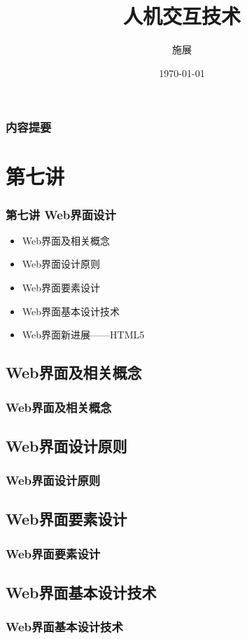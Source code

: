 \documentclass{beamer}
\title{人机交互技术}
\author{施展}
\institute{华中科技大学~武汉光电国家实验室}
\date{\today}
\begin{document}
\begin{frame}
	\titlepage
\end{frame}

\begin{frame}
	\frametitle{内容提要}
	\tableofcontents
\end{frame}

\section{第七讲}
\begin{frame}
	\frametitle{第七讲 Web界面设计}
	\begin{itemize}
		\item Web界面及相关概念
		\item Web界面设计原则
		\item Web界面要素设计
		\item Web界面基本设计技术
		\item Web界面新进展——HTML5
	\end{itemize}
\end{frame}

\subsection{Web界面及相关概念}
\begin{frame}
	\frametitle{Web界面及相关概念}

\end{frame}

\subsection{Web界面设计原则}
\begin{frame}
	\frametitle{Web界面设计原则}

\end{frame}

\subsection{Web界面要素设计}
\begin{frame}
	\frametitle{Web界面要素设计}

\end{frame}

\subsection{Web界面基本设计技术}
\begin{frame}
	\frametitle{Web界面基本设计技术}

\end{frame}
\end{document}
